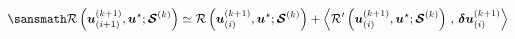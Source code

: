\documentclass[preview]{standalone}
\begin{document}
$ \displaystyle \sansmath
  \mathcal{R}\left( \boldsymbol{u}_{(i+1)}^{(k+1)}, \boldsymbol{u}^{\star} ; \boldsymbol{\mathcal{S}}^{(k)} \right) \simeq \mathcal{R}\left( \boldsymbol{u}_{(i)}^{(k+1)}, \boldsymbol{u}^{\star} ; \boldsymbol{\mathcal{S}}^{(k)} \right) + \left\langle 
\mathcal{R}'\left( \boldsymbol{u}_{(i)}^{(k+1)}, \boldsymbol{u}^{\star} ; \boldsymbol{\mathcal{S}}^{(k)} \right) \, , \, \boldsymbol{\delta u}_{(i)}^{(k+1)} \right\rangle
$
\end{document}
